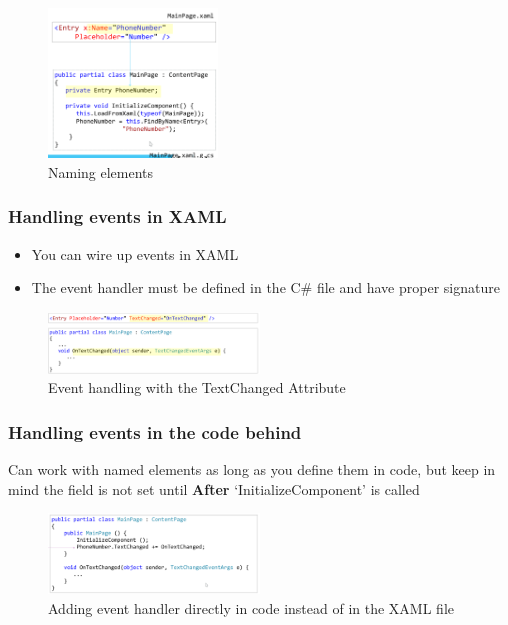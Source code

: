 \documentclass{article}
\newcommand{\bold}[1]{\textbf{#1}}
\begin{document}
\begin{figure}[H]
    \centering
    \includegraphics[width=0.4\textwidth]{xaml07.png}
    \caption{Naming elements}
\end{figure}

\subsubsection{Handling events in XAML}

\begin{itemize}
    \item You can wire up events in XAML
    \item The event handler must be defined in the C\# file and have proper signature
\end{itemize}

\begin{figure}[H]
    \centering
    \includegraphics[width=0.5\textwidth]{xaml08.png}
    \caption{Event handling with the TextChanged Attribute}
\end{figure}

\subsubsection{Handling events in the code behind}

Can work with named elements as long as you define them in code, but keep in mind the field is not set until \bold{After} `InitializeComponent' is called

\begin{figure}[H]
    \centering
    \includegraphics[width=0.5\textwidth]{xaml09.png}
    \caption{Adding event handler directly in code instead of in the XAML file}
\end{figure}
\end{document}
